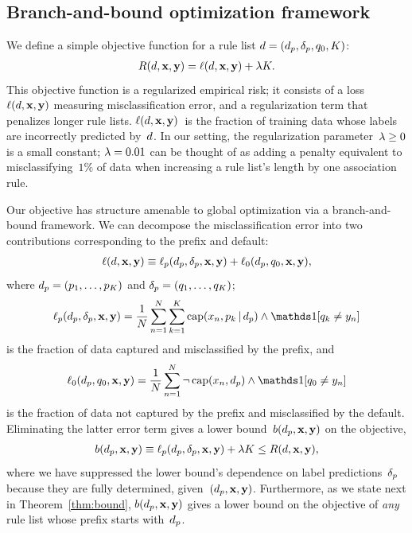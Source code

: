 \subsection{Branch-and-bound optimization framework}

We define a simple objective function for a rule list ${{d} = (d_p, \delta_p, q_0, K)}$:
\begin{align}
\Obj(\RL, \x, \y) = \Loss(\RL, \x, \y) + \Reg K.
\label{eq:objective}
\end{align}
This objective function is a regularized empirical risk;
it consists of a loss~$\ell({d}, \mathbf{x}, \mathbf{y})$ measuring misclassification error,
and a regularization term that penalizes longer rule lists.
%
$\ell({d}, \mathbf{x}, \mathbf{y})$~is the fraction of training data whose labels are
incorrectly predicted by~${d}$.
%
In our setting, the regularization parameter~${{\lambda} \ge 0}$ is a small constant;
\eg ${{\lambda} = 0.01}$ can be thought of as adding a penalty equivalent to misclassifying~$1\%$
of data when increasing a rule list's length by one association rule.
%

Our objective has structure amenable to global optimization via a branch-and-bound framework.
%
We can decompose the misclassification error into two contributions
corresponding to the prefix and default:
\begin{align}
\Loss(\RL, \x, \y) %
\equiv \Loss_p(\Prefix, \Labels, \x, \y) + \Loss_0(\Prefix, \Default, \x, \y),
\end{align}
where ${d_p = (p_1, \dots, p_K)}$ and ${\delta_p = (q_1, \dots, q_K)}$;
\begin{align}
\Loss_p(\Prefix, \Labels, \x, \y) =
\frac{1}{N} \sum_{n=1}^N \sum_{k=1}^K \Cap(x_n, p_k \given \Prefix) \wedge \one [ q_k \neq y_n ]
\label{eq:loss}
\end{align}
is the fraction of data captured and misclassified by the prefix, and
\begin{align}
\Loss_0(\Prefix, \Default, \x, \y) =
\frac{1}{N} \sum_{n=1}^N \neg\, \Cap(x_n, \Prefix) \wedge \one [ \Default \neq y_n ]
\end{align}
is the fraction of data not captured by the prefix and misclassified by the default.
%
Eliminating the latter error term gives a lower bound~$b(d_p, \mathbf{x}, \mathbf{y})$ on the objective,
\begin{align}
b(\Prefix, \x, \y) \equiv \Loss_p(\Prefix, \Labels, \x, \y) + \Reg K \le \Obj(\RL, \x, \y),
\label{eq:lower-bound}
\end{align}
where we have suppressed the lower bound's dependence on label predictions~$\delta_p$
because they are fully determined, given~${(d_p, \mathbf{x}, \mathbf{y})}$.
%
Furthermore, as we state next in Theorem~\ref{thm:bound},
$b(d_p, \mathbf{x}, \mathbf{y})$ gives a lower bound on the objective of
\emph{any} rule list whose prefix starts with~$d_p$.

